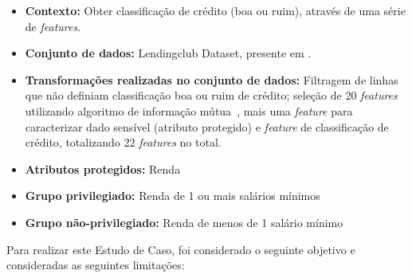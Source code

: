 \documentclass[portugues]{ic-tese}
\begin{document}
\begin{itemize}
\item \textbf{Contexto:} Obter classificação de crédito (boa ou ruim), através de uma série de \textit{features}.

\item \textbf{Conjunto de dados:} Lendingclub Dataset, presente em \citep{lendingclub_2022}.

\item \textbf{Transformações realizadas no conjunto de dados:} Filtragem de linhas que não definiam classificação boa ou ruim de crédito; seleção de 20 \textit{features} utilizando algoritmo de informação mútua~\citep{Ross_2014}, mais uma \textit{feature} para caracterizar dado sensível (atributo protegido) e \textit{feature} de classificação de crédito, totalizando 22 \textit{features} no total.

\item \textbf{Atributos protegidos:} Renda

\item \textbf{Grupo privilegiado:} Renda de 1 ou mais salários mínimos

\item \textbf{Grupo não-privilegiado:} Renda de menos de 1 salário mínimo

\end{itemize}

Para realizar este Estudo de Caso, foi considerado o seguinte objetivo e consideradas as seguintes limitações:
\end{document}
